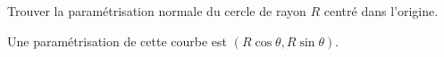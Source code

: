 \begin{exercice}\label{exocontrolecontinu0012}

Trouver la paramétrisation normale du cercle de rayon $R$ centré dans l'origine. 

Une paramétrisation de cette courbe est $(R\cos\theta, R\sin\theta)$.  

  
\end{exercice}
